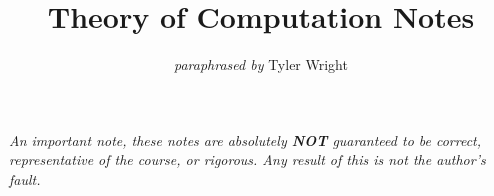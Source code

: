 \documentclass[a4paper, 12pt, twoside]{article}
\begin{document}
\title{Theory of Computation Notes}
\date{}
\author{\textit{paraphrased by} Tyler Wright}
\maketitle

\vfill

\textit{An important note, these notes are absolutely \textbf{NOT}
  guaranteed to be correct, representative of the course, or rigorous.
  Any result of this is not the author's fault.}

% 

\newpage

\tableofcontents


\end{document}
